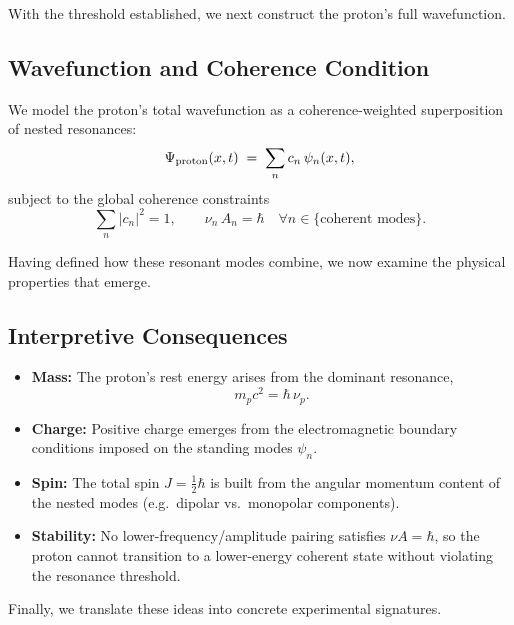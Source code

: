 \bigskip
With the threshold established, we next construct the proton’s full wavefunction.

\subsection{Wavefunction and Coherence Condition}
We model the proton’s total wavefunction as a coherence-weighted superposition of nested resonances:
\[
\Psi_{\rm proton}(x,t) \;=\; \sum_{n} c_n\,\psi_n(x,t),
\]
subject to the global coherence constraints
\[
\sum_n |c_n|^2 = 1,
\qquad
\nu_n\,A_n = \hbar
\quad\forall n\in\{\text{coherent modes}\}.
\]

\bigskip
Having defined how these resonant modes combine, we now examine the physical properties that emerge.

\subsection{Interpretive Consequences}
\begin{itemize}
  \item \textbf{Mass:} The proton’s rest energy arises from the dominant resonance,
    \[
      m_p c^2 = \hbar\,\nu_p.
    \]
  \item \textbf{Charge:} Positive charge emerges from the electromagnetic boundary conditions imposed on the standing modes \(\psi_n\).
  \item \textbf{Spin:} The total spin \(J=\tfrac12\hbar\) is built from the angular momentum content of the nested modes (e.g.\ dipolar vs.\ monopolar components).
  \item \textbf{Stability:} No lower-frequency/amplitude pairing satisfies \(\nu A = \hbar\), so the proton cannot transition to a lower-energy coherent state without violating the resonance threshold.
\end{itemize}

\bigskip
Finally, we translate these ideas into concrete experimental signatures.

